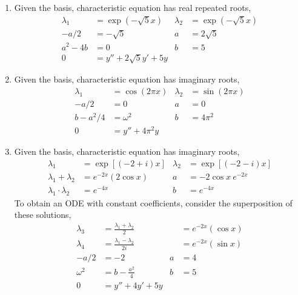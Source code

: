 \begin{enumerate}
    \item Given the basis, characteristic equation has real repeated roots,
          \begin{align}
              \lambda_{1} & = \exp(-\sqrt{5}x)       &
              \lambda_{2} & = \exp(-\sqrt{5}x)         \\
              -a/2        & = -\sqrt{5}              &
              a           & = 2\sqrt{5}                \\
              a^{2} - 4b  & = 0                      &
              b           & =   5                      \\
              0           & = y'' + 2\sqrt{5}y' + 5y
          \end{align}

    \item Given the basis, characteristic equation has imaginary roots,
          \begin{align}
              \lambda_{1} & = \cos(2\pi x)     & \lambda_{2} & = \sin(2\pi x) \\
              -a/2        & = 0                & a           & = 0            \\
              b - a^{2}/4 & = \omega ^{2}      & b           & =   4\pi ^{2}  \\
              0           & = y'' + 4\pi ^{2}y
          \end{align}

    \item Given the basis, characteristic equation has imaginary roots,
          \begin{align}
              \lambda_{1}                   & = \exp[(-2+i)x]     &
              \lambda_{2}                   & = \exp[(-2-i)x]       \\
              \lambda_{1} + \lambda_{2}     & = e^{-2x}(2\cos x)  &
              a                             & = -2\cos x\ e^{-2x}   \\
              \lambda_{1} \cdot \lambda_{2} & = e^{-4x}           &
              b                             & =   e^{-4x}
          \end{align}
          To obtain an ODE with constant coefficients, consider the superposition of
          these solutions,
          \begin{align}
              \lambda_{3} & = \frac{\lambda_{1} + \lambda_{2}}{2}  &
                          & = e^{-2x}(\cos x)                        \\
              \lambda_{4} & = \frac{\lambda_{1} - \lambda_{2}}{2i} &
                          & = e^{-2x}(\sin x)                        \\
              -a/2        & = -2                                   &
              a           & = 4                                      \\
              \omega ^{2} & = b - \frac{a^{2}}{4}                  &
              b           & = 5                                      \\
              0           & = y'' + 4y' + 5y
          \end{align}


\end{enumerate}
